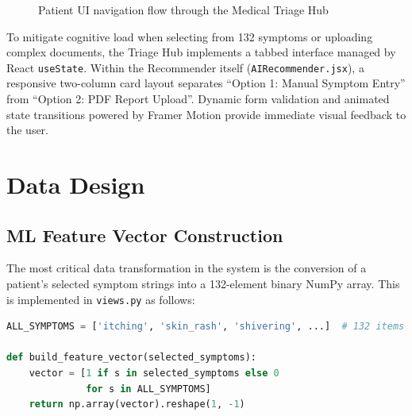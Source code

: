 \begin{figure}[htbp]
\centering
{}
\caption{Patient UI navigation flow through the Medical Triage Hub}
\label{fig:triage_flow}
\end{figure}

To mitigate cognitive load when selecting from 132 symptoms or uploading complex documents, the Triage Hub implements a tabbed interface managed by React \texttt{useState}. Within the Recommender itself (\texttt{AIRecommender.jsx}), a responsive two-column card layout separates ``Option 1: Manual Symptom Entry'' from ``Option 2: PDF Report Upload''. Dynamic form validation and animated state transitions powered by Framer Motion provide immediate visual feedback to the user.

\section{Data Design}

\subsection{ML Feature Vector Construction}
The most critical data transformation in the system is the conversion of a patient's selected symptom strings into a 132-element binary NumPy array. This is implemented in \texttt{views.py} as follows:

\begin{lstlisting}[language=Python, caption=Symptom-to-binary vector construction]
ALL_SYMPTOMS = ['itching', 'skin_rash', 'shivering', ...]  # 132 items

def build_feature_vector(selected_symptoms):
    vector = [1 if s in selected_symptoms else 0
              for s in ALL_SYMPTOMS]
    return np.array(vector).reshape(1, -1)
\end{lstlisting}


